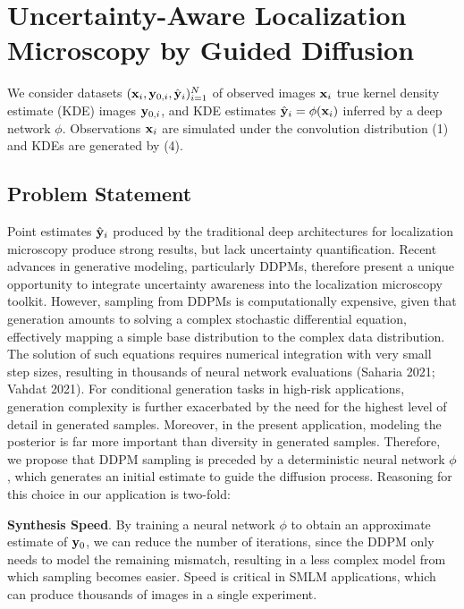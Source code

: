 \documentclass{article}
\begin{document}
\section{Uncertainty-Aware Localization Microscopy by Guided Diffusion}

We consider datasets $(\bold{x}_i,\bold{y}_{0,i},\hat{\bold{y}}_{i})_{i=1}^{N}$ of observed images $\bold{x}_i$ true kernel density estimate (KDE) images $\bold{y}_{0,i}$, and KDE estimates $\hat{\bold{y}}_{i}=\phi(\bold{x}_{i})$ inferred by a deep network $\phi$. Observations $\bold{x}_i$ are simulated under the convolution distribution (1) and KDEs are generated by (4).

\subsection{Problem Statement}

Point estimates $\hat{\bold{y}}_{i}$ produced by the traditional deep architectures for localization microscopy produce strong results, but lack uncertainty quantification. Recent advances in generative modeling, particularly DDPMs, therefore present a unique opportunity to integrate uncertainty awareness into the localization microscopy toolkit. However, sampling from DDPMs is computationally expensive, given that generation amounts to solving a complex stochastic differential equation, effectively mapping a simple base distribution to the complex data distribution. The solution of such equations requires numerical integration with very small step sizes, resulting in thousands of neural network evaluations (Saharia 2021; Vahdat 2021). For conditional generation tasks in high-risk applications, generation complexity is further exacerbated by the need for the highest level of detail in generated samples. Moreover, in the present application, modeling the posterior is far more important than diversity in generated samples. Therefore, we propose that DDPM sampling is preceded by a deterministic neural network $\phi$, which generates an initial estimate to guide the diffusion process. Reasoning for this choice in our application is two-fold:

\textbf{Synthesis Speed}. By training a neural network $\phi$ to obtain an approximate estimate of $\bold{y}_{0}$, we can reduce the number of iterations, since the DDPM only needs to model the remaining mismatch, resulting in a less complex model from which sampling becomes easier. Speed is critical in SMLM applications, which can produce thousands of images in a single experiment.\\
\end{document}
